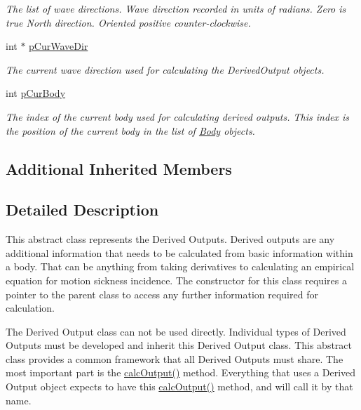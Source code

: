 \begin{DoxyCompactItemize}
\begin{DoxyCompactList}\small\item\em The list of wave directions. Wave direction recorded in units of radians. Zero is true North direction. Oriented positive counter-\/clockwise. \end{DoxyCompactList}\item 
\hypertarget{class_output_derived_a408bb4755c3f283773bc3d8923f7e7f4}{int $\ast$ \hyperlink{class_output_derived_a408bb4755c3f283773bc3d8923f7e7f4}{p\-Cur\-Wave\-Dir}}\label{class_output_derived_a408bb4755c3f283773bc3d8923f7e7f4}

\begin{DoxyCompactList}\small\item\em The current wave direction used for calculating the Derived\-Output objects. \end{DoxyCompactList}\item 
\hypertarget{class_output_derived_acf0ac8dbd4ead154a92d7d77d8893c1b}{int \hyperlink{class_output_derived_acf0ac8dbd4ead154a92d7d77d8893c1b}{p\-Cur\-Body}}\label{class_output_derived_acf0ac8dbd4ead154a92d7d77d8893c1b}

\begin{DoxyCompactList}\small\item\em The index of the current body used for calculating derived outputs. This index is the position of the current body in the list of \hyperlink{class_body}{Body} objects. \end{DoxyCompactList}\end{DoxyCompactItemize}
\subsection*{Additional Inherited Members}


\subsection{Detailed Description}
This abstract class represents the Derived Outputs. Derived outputs are any additional information that needs to be calculated from basic information within a body. That can be anything from taking derivatives to calculating an empirical equation for motion sickness incidence. The constructor for this class requires a pointer to the parent class to access any further information required for calculation.

The Derived Output class can not be used directly. Individual types of Derived Outputs must be developed and inherit this Derived Output class. This abstract class provides a common framework that all Derived Outputs must share. The most important part is the \hyperlink{class_output_derived_a7a65864e45519edfe7fe45c408457f41}{calc\-Output()} method. Everything that uses a Derived Output object expects to have this \hyperlink{class_output_derived_a7a65864e45519edfe7fe45c408457f41}{calc\-Output()} method, and will call it by that name.

